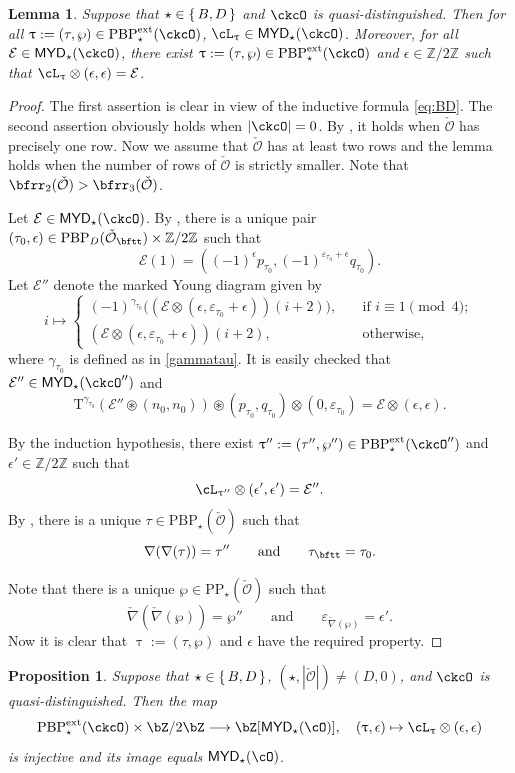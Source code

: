 \documentclass[11pt,a4paper]{amsart}
\def\MYD{{\mathsf{MYD}}}
\def\abs#1{\left|{#1}\right|}
\newcommand{\CE}{{\mathcal {E}}}
\newcommand{\CO}{{\mathcal {O}}}
\newcommand{\Z}{\mathbb{Z}}
\newcommand{\be}{\begin {equation}}
\newcommand{\ee}{\end {equation}}
\numberwithin{equation}{section}
\newtheorem{lem}[thm]{Lemma}
\newtheorem{prop}[thm]{Proposition}
\theoremstyle{remark}
\def\PBPe{\mathrm{PBP}^{\mathrm{ext}}}
\def\PBPes{\mathrm{PBP}^{\mathrm{ext}}_{\star}}
\def\PP{\mathrm{PP}}
\def\PBP{\mathrm{PBP}}
\def\MYD{{\mathsf{MYD}}}
\def\ac{\cL}
\begin{document}
\begin{lem}\label{lem:BD22223}
Suppose that $\star \in \set{B,D}$ and
$\ckcO$ is quasi-distinguished. Then for all $\uptau:=(\tau, \wp)\in \PBPe_\star(\ckcO)$,
$ \ac_{\uptau}\in \MYD_\star(\ckcO)$. Moreover, for all $\CE\in \MYD_\star(\ckcO)$, there exist  $\uptau:=(\tau, \wp)\in \PBPe_\star(\ckcO)$ and $\epsilon\in \Z/2\Z$ such that
$\ac_\uptau\otimes (\epsilon, \epsilon)=\CE$.
\end{lem}
\begin{proof}
The first assertion is clear in view of the inductive formula \eqref{eq:BD}.
The second assertion obviously holds when $\abs{\ckcO}=0$. By , it holds when $\check \CO$ has precisely one row.
Now we assume that $\check \CO$ has at least two rows and the lemma holds when the number of rows of $\check \CO$ is strictly smaller.  Note that $\bfrr_2(\check \CO)>\bfrr_3(\check \CO)$.




Let  $\CE\in \MYD_\star(\ckcO)$. By , there is a unique pair $(\tau_0, \epsilon)\in \PBP_D(\check \CO_\bftt)\times \Z/2\Z$ such that
\[
  \CE(1)=((-1)^\epsilon p_{\tau_0}, (-1)^{\varepsilon_{\tau_0}+\epsilon} q_{\tau_0}).
\]
Let $\CE''$ denote the marked Young diagram given by
\[
i\mapsto \begin{cases}
     (-1)^{\gamma_{\tau_0}} \big((\CE\otimes (\epsilon, \varepsilon_{\tau_0}+\epsilon))(i+2)\big),\quad &\textrm{if $i\equiv 1 \pmod{4}$};\\
     (\CE\otimes (\epsilon, \varepsilon_{\tau_0}+\epsilon))(i+2),\quad &\textrm{otherwise},
  \end{cases}
\]
where $\gamma_{\tau_0}$ is defined as in \eqref{gammatau}.
It is easily checked that $\CE''\in \MYD_\star(\ckcO'')$ and
\[
  \mathrm T^{\gamma_{\tau_0}}(\CE''\circledast (n_0,n_0))\circledast (p_{\tau_0},q_{\tau_0}) \otimes (0, \varepsilon_{\tau_0})=\CE\otimes (\epsilon, \epsilon).
\]

By the induction hypothesis, there exist $\uptau'':=(\tau'', \wp'')\in \PBPe_\star(\ckcO'')$ and $\epsilon'\in \Z/2\Z$  such that
\[
\ac_{\uptau''}\otimes (\epsilon', \epsilon')=\CE''.
\]
By , there is a unique $\tau\in \PBP_\star(\check \CO)$ such that
\[
  \nabla(\nabla(\tau))=\tau''\qquad\textrm{and}\qquad \tau_\bftt=\tau_0.
\]

Note that there is a unique $\wp\in \PP_\star(\check \CO)$ such that
\[
 \check \nabla( \check \nabla(\wp))=\wp''\qquad \textrm{and}\qquad
 \varepsilon_{\check \nabla(\wp)}=\epsilon'.
\]
Now it is clear that $\uptau:=(\tau, \wp)$ and $\epsilon$ have the required property.
\end{proof}
\begin{prop}\label{lem:BDinj0}
Suppose that $\star \in \set{B,D}$, $(\star, \abs{\check \CO})\neq (D, 0)$, and
$\ckcO$ is quasi-distinguished. Then the map
 \be\label{acme0}
    \PBPes( \ckcO )\times \bZ/2\bZ \longrightarrow \bZ[\MYD_{\star}(\cO)],\quad
    (\uptau,\epsilon) \mapsto \ac_{\uptau}\otimes (\epsilon, \epsilon)
  \ee
is injective and its image equals $\MYD_{\star}(\cO)$.
\end{prop}
\end{document}

